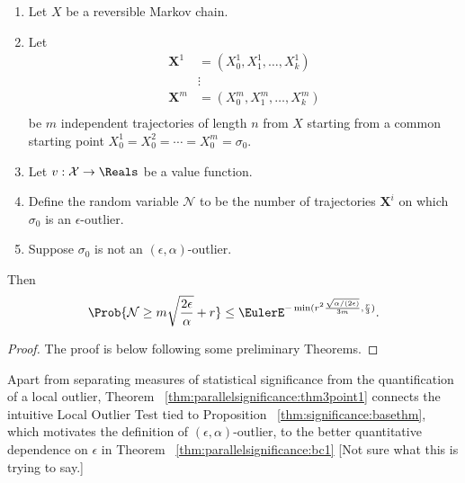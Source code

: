 \documentclass[12pt]{article}
\begin{document}
\begin{theorem}
    \label{thm:parallelsignificance:thm3point1}
    \begin{enumerate}
        \item
            Let \( X \) be a reversible Markov chain.
        \item
            Let
            \begin{align*}
                \mathbf{X}^1 &= (X_0^1, X_1^1, \dots, X_k^1 )\\
                &\vdots \\
                \mathbf{X}^m &= (X_0^m, X_1^m, \dots, X_k^m )\\
            \end{align*}
            be \( m \) independent trajectories of length \( n \) from \(
            X \) starting from a common starting point \( X_0^1 =
            X_0^2 = \cdots = X_0^m = \sigma_0 \). 
        \item
            Let \( v :  \mathcal{X} \to \Reals \) be a value function.
        \item
            Define the random variable \( \mathcal{N} \) to be the
            number of trajectories \( \mathbf{X}^i \) on which \( \sigma_0
            \) is an \( \epsilon \)-outlier.
        \item
            Suppose \( \sigma_0 \) is not an \( (\epsilon, \alpha) \)-outlier.
    \end{enumerate}
    Then
    \[
        \Prob{\mathcal{N} \ge m \sqrt{\frac{2\epsilon}{\alpha}} + r} \le
        \EulerE^{-\min(r^2 \frac{\sqrt{\alpha/(2\epsilon)}}{3m}, \frac{r}
        {3})}.
    \]
\end{theorem}

\begin{proof}
    The proof is below following some preliminary Theorems.
\end{proof}

\begin{remark}
    Apart from separating measures of statistical significance from the
    quantification of a local outlier, Theorem~%
    \ref{thm:parallelsignificance:thm3point1} connects the intuitive Local
    Outlier Test tied to Proposition~%
    \ref{thm:significance:basethm}, which motivates the definition of \(
    (\epsilon, \alpha) \)-outlier, to the better quantitative dependence
    on \( \epsilon \) in Theorem~%
    \ref{thm:parallelsignificance:bc1} [Not sure what this is trying to say.]
\end{remark}
\end{document}
